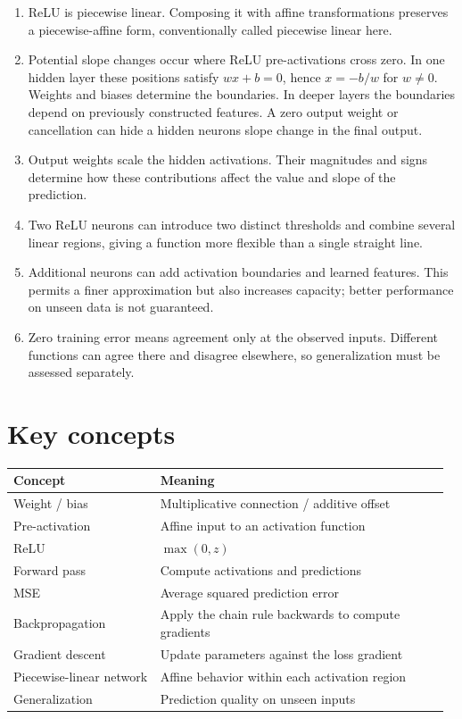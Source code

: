 \documentclass{course_sheet}
\providecommand{\tightlist}{%
  \setlength{\itemsep}{0pt}\setlength{\parskip}{0pt}}
\begin{document}
\begin{enumerate}
\def\labelenumi{\arabic{enumi}.}
\tightlist
\item
  ReLU is piecewise linear. Composing it with affine transformations
  preserves a piecewise-affine form, conventionally called piecewise
  linear here.
\item
  Potential slope changes occur where ReLU pre-activations cross zero.
  In one hidden layer these positions satisfy $wx+b=0$, hence $x=-b/w$
  for $w\neq0$. Weights and biases determine the boundaries. In deeper
  layers the boundaries depend on previously constructed features. A
  zero output weight or cancellation can hide a hidden
  neuron\textquotesingle s slope change in the final output.
\item
  Output weights scale the hidden activations. Their magnitudes and
  signs determine how these contributions affect the value and slope of
  the prediction.
\item
  Two ReLU neurons can introduce two distinct thresholds and combine
  several linear regions, giving a function more flexible than a single
  straight line.
\item
  Additional neurons can add activation boundaries and learned features.
  This permits a finer approximation but also increases capacity; better
  performance on unseen data is not guaranteed.
\item
  Zero training error means agreement only at the observed inputs.
  Different functions can agree there and disagree elsewhere, so
  generalization must be assessed separately.
\end{enumerate}

\section{Key concepts}

\begin{center}

\begingroup
\setlength{\tabcolsep}{3pt}
\begin{tabular}{@{}p{0.328\linewidth}p{0.638\linewidth}@{}}
\toprule
Concept & Meaning \\
\midrule
Weight / bias & Multiplicative connection / additive offset \\
Pre-activation & Affine input to an activation function \\
ReLU & $\max(0,z)$ \\
Forward pass & Compute activations and predictions \\
MSE & Average squared prediction error \\
Backpropagation & Apply the chain rule backwards to compute gradients \\
Gradient descent & Update parameters against the loss gradient \\
Piecewise-linear network & Affine behavior within each activation region \\
Generalization & Prediction quality on unseen inputs \\
\bottomrule
\end{tabular}
\endgroup

\end{center}
\end{document}
